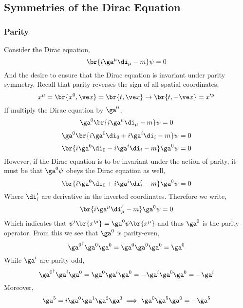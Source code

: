 \documentclass{article}
\begin{document}
\subsection{Symmetries of the Dirac Equation}

\subsubsection{Parity}
Consider the Dirac equation,
\[ \br{i \ga^{\mu} \di_{\mu} - m} \psi = 0 \]
And the desire to ensure that the Dirac equation is invariant under parity symmetry. Recall that parity reverses the sign of all spatial coordinates,
\[ x^{\mu} = \br{x^0, \ve x} = \br{t , \ve x} \to \br{t, - \ve x} = x'^{\mu} \]
If multiply the Dirac equation by $\ga^{0}$,
\[ \ga^{0} \br{i \ga^{\mu} \di_{\mu} - m} \psi = 0 \]
\[ \ga^{0} \br{i \ga^{0} \di_{0} + i \ga^{i} \di_{i} - m} \psi = 0 \]
\[ \br{i \ga^{0} \di_{0} - i \ga^{i} \di_{i} - m} \ga^{0} \psi = 0 \]
However, if the Dirac equation is to be invariant under the action of parity, it must be that $\ga^{0} \psi$ obeys the Dirac equation as well,
\[ \br{i \ga^{0} \di_{0} + i \ga^{i} \di'_{i} - m} \ga^{0} \psi = 0 \]
Where $\di'_{i}$ are derivative in the inverted coordinates. Therefore we write,
\[ \br{i \ga^{\mu} \di'_{\mu} - m} \ga^{0} \psi = 0 \]
Which indicates that $\psi'\br{x'^{\mu}} = \ga^{0} \psi\br{x^{\mu}}$ and thus $\ga^{0}$ is the parity operator.
From this we see that $\ga^{0}$ is parity-even,
\[ {\ga^{0}}^{\dagger} \ga^{0} \ga^{0} = \ga^{0}\ga^{0}\ga^{0} = \ga^{0} \]
While $\ga^{i}$ are parity-odd,
\[ {\ga^{0}}^{\dagger} \ga^{i} \ga^{0} = \ga^{0}\ga^{i}\ga^{0} = -\ga^{i}\ga^{0}\ga^{0} = -\ga^{i} \]
Moreover,
\[ \ga^{5} = i \ga^{0} \ga^{1} \ga^{2} \ga^{3} \implies \ga^{0} \ga^{5} \ga^{0} = - \ga^{5} \]
\end{document}
